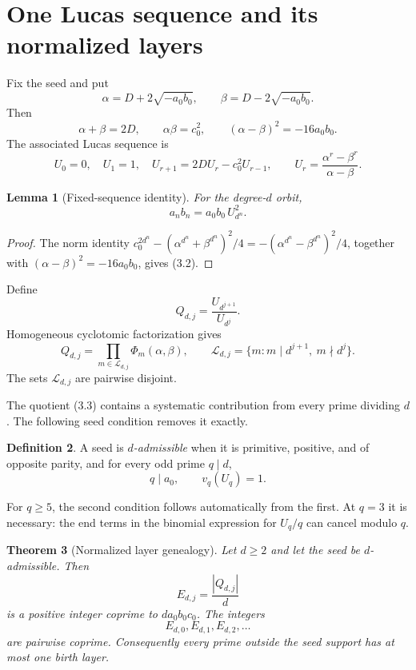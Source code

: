 \documentclass[11pt]{article}
\newtheorem{theorem}{Theorem}
\newtheorem{lemma}[theorem]{Lemma}
\theoremstyle{definition}
\newtheorem{definition}[theorem]{Definition}
\theoremstyle{remark}
\begin{document}
\section{One Lucas sequence and its normalized layers}

Fix the seed and put
\[
 \alpha=D+2\sqrt{-a_0b_0},\qquad
 \beta =D-2\sqrt{-a_0b_0}.
\]
Then
\[
 \alpha+\beta=2D,\qquad \alpha\beta=c_0^2,
 \qquad(\alpha-\beta)^2=-16a_0b_0.
\]
The associated Lucas sequence is
\[
 U_0=0,\quad U_1=1,\quad
 U_{r+1}=2D U_r-c_0^2U_{r-1},
 \qquad
 U_r=\frac{\alpha^r-\beta^r}{\alpha-\beta}.
 \tag{3.1}
\]

\begin{lemma}[Fixed-sequence identity]\label{lem:fixed-sequence}
For the degree-$d$ orbit,
\[
 a_nb_n=a_0b_0\,U_{d^n}^2.
 \tag{3.2}
\]
\end{lemma}

\begin{proof}
The norm identity
\(c_0^{2d^n}-(\alpha^{d^n}+\beta^{d^n})^2/4
=- (\alpha^{d^n}-\beta^{d^n})^2/4\), together with
\((\alpha-\beta)^2=-16a_0b_0\), gives (3.2).
\end{proof}

Define
\[
 Q_{d,j}=\frac{U_{d^{j+1}}}{U_{d^j}}.
 \tag{3.3}
\]
Homogeneous cyclotomic factorization gives
\[
 Q_{d,j}
 =\prod_{m\in\mathcal L_{d,j}}\Phi_m(\alpha,\beta),
 \qquad
 \mathcal L_{d,j}
 =\{m:m\mid d^{j+1},\ m\nmid d^j\}.
 \tag{3.4}
\]
The sets \(\mathcal L_{d,j}\) are pairwise disjoint.

The quotient (3.3) contains a systematic contribution from every prime
dividing $d$.  The following seed condition removes it exactly.

\begin{definition}
A seed is \emph{$d$-admissible} when it is primitive, positive, and of
opposite parity, and for every odd prime $q\mid d$,
\[
 q\mid a_0,\qquad v_q(U_q)=1.
 \tag{3.5}
\]
\end{definition}

For $q\ge5$, the second condition follows automatically from the first.
At $q=3$ it is necessary: the end terms in the binomial expression for
\(U_q/q\) can cancel modulo $q$.

\begin{theorem}[Normalized layer genealogy]\label{thm:genealogy}
Let $d\ge2$ and let the seed be $d$-admissible.  Then
\[
 E_{d,j}=\frac{|Q_{d,j}|}{d}
 \tag{3.6}
\]
is a positive integer coprime to $d a_0b_0c_0$.  The integers
\[
 E_{d,0},E_{d,1},E_{d,2},\ldots
\]
are pairwise coprime.  Consequently every prime outside the seed support
has at most one birth layer.
\end{theorem}
\end{document}
